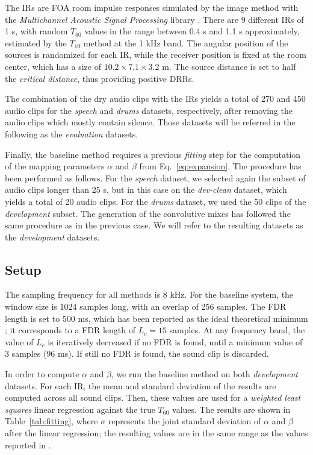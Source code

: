 The IRs are FOA room impulse responses simulated by the image method with the \textit{Multichannel Acoustic Signal Processing} library . There are 9 different IRs of 1 s, with random $T_{60}$ values in the range between 0.4 s and 1.1 s approximately, estimated by the $T_{10}$ method at the 1 kHz band. The angular position of the sources is randomized for each IR, while the receiver position is fixed at the room center, which has a size of $10.2 \times 7.1 \times 3.2$ m. The source distance is set to half the \textit{critical distance}, thus providing positive DRRs. 

The combination of the dry audio clips with the IRs yields a total of 270 and 450 audio clips for the \textit{speech} and \textit{drums} datasets, respectively, after removing the audio clips which mostly contain silence. Those datasets will be referred in the following as the \textit{evaluation} datasets. 

Finally, the baseline method requires a previous \textit{fitting} step for the computation of the mapping parameters $\alpha$ and $\beta$ from Eq.~\ref{eq:expansion}. The procedure has been performed as follows.
For the \textit{speech} dataset, we selected again the subset of audio clips longer than 25 s, but in this case on the \textit{dev-clean} dataset, which yields a total of 20 audio clips. 
For the \textit{drums} dataset, we used the 50 clips of the \textit{development} subset.
The generation of the convolutive mixes has followed the same procedure as in the previous case. We will refer to the resulting datasets as the \textit{development} datasets. 

\subsection{Setup}
\label{sec:setup}


The sampling frequency for all methods is 8 kHz.
For the baseline system, the window size is 1024 samples long, with an overlap of 256 samples. The FDR length is set to 500 ms, which has been reported as the ideal theoretical minimum \cite{prego2012blind}; it corresponds to a FDR length of $L_c = 15$ samples. 
At any frequency band, the value of $L_c$ is iteratively decreased if no FDR is found, until a minimum value of 3 samples (96 ms). If still no FDR is found, the sound clip is discarded. 

In order to compute $\alpha$ and $\beta$, we run the baseline method on both \textit{development} datasets. For each IR, the mean and standard deviation of the results are computed across all sound clips. Then, these values are used for a \textit{weighted least squares} linear regression against the true $T_{60}$ values.
The results are shown in Table~\ref{tab:fitting}, where $\sigma$ represents the joint standard deviation of $\alpha$ and $\beta$ after the linear regression; 
the resulting values are in the same range as the values reported in \cite{prego2012blind}. 


